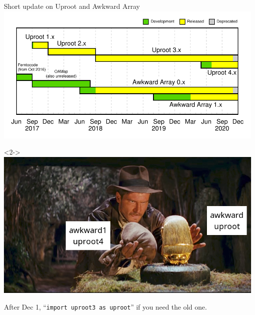 \documentclass[aspectratio=169]{beamer}
\begin{document}
\begin{frame}{Short update on Uproot and Awkward Array}
\includegraphics[width=\linewidth]{uproot-awkward-timeline.pdf}

\begin{uncoverenv}<2->
\vspace{-4.28 cm}
\includegraphics[height=4.28 cm]{Raiders-of-the-Lost-Ark-Chamber.jpg}

\begin{center}
After Dec 1, ``\texttt{import uproot3 as uproot}'' if you need the old one.
\end{center}
\end{uncoverenv}
\end{frame}
\end{document}
